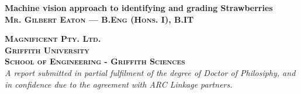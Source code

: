 \documentclass[fleqn,twoside,12pt]{report}
\begin{document}
\raggedbottom

\begin{titlepage}


\newcommand{\HRule}{\rule{\linewidth}{0.5mm}} %
 
\begin{flushleft} 
 



{ \Huge \bfseries Machine vision approach to identifying and grading Strawberries}\\[1.5cm] %


\textsc{\Large \bfseries Mr. Gilbert Eaton --- B.Eng (Hons. I), B.IT}\\[0.5cm] %
 
 
 
\vspace{10mm} 



\textsc{\Large \bfseries Magnificent Pty. Ltd.}\\[0.5cm] %
\textsc{\Large \bfseries Griffith University}\\[0.5cm] %
\textsc{\Large \bfseries School of Engineering - Griffith Sciences}\\[1.5cm] %



\emph{A report submitted in partial fulfilment of the degree of Doctor of Philosiphy, and in confidence due to the agreement with ARC Linkage partners.}\\[1.5cm]




\end{flushleft}

\vfill %

\end{titlepage}
\end{document}
